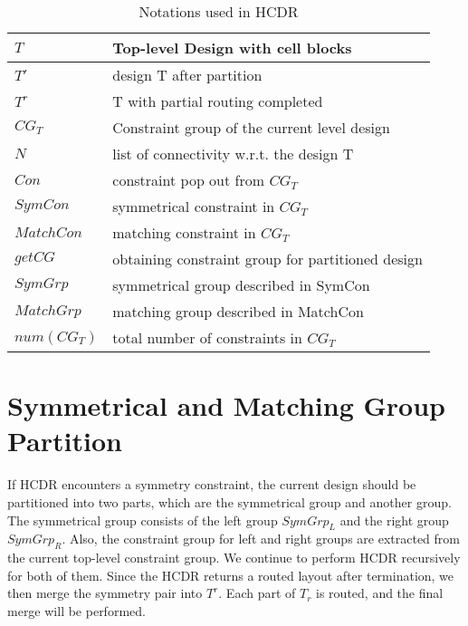     \begin{table}[ht]
      \centering
      \vspace{-1em}
    \caption{Notations used in HCDR}
    \begin{scriptsize}
    \begin{tabular}[t]{|l|l|}
      \hline
      $T$       & Top-level Design with cell blocks \\
      \hline
      $T'$      &   design T after partition      \\
      \hline
      $T^r$       &   T with partial routing completed  \\
      \hline
      $CG_T$      & Constraint group of the current level design  \\
      \hline
      $N$       & list of connectivity w.r.t. the design T  \\
      \hline
      $Con  $   & constraint pop out from $CG_T$    \\
      \hline
      $SymCon$    & symmetrical constraint in $CG_T$  \\
      \hline
      $MatchCon$    & matching constraint in $CG_T$   \\
      \hline
      $getCG$     & obtaining constraint group for partitioned design \\
      \hline
      $SymGrp$    & symmetrical group described in SymCon \\
      \hline
      $MatchGrp$    & matching group described in MatchCon  \\
      \hline
      $num(CG_T)$   & total number of constraints in $CG_T$ \\
      \hline
    \end{tabular}
    \end{scriptsize}
    \label{tableNotation}
    \end{table}
    \vspace{-1em}


  \section{Symmetrical and Matching Group Partition}\label{sec:SMGrp}
    
    If HCDR encounters a symmetry constraint, the current design should be partitioned into two parts, which are the symmetrical group and another group. The symmetrical group consists of the left group $SymGrp_L $ and the right group $SymGrp_R$. Also, the constraint group for left and right groups are extracted from the current top-level constraint group. We continue to perform HCDR recursively for both of them. Since the HCDR returns a routed layout after termination, we then merge the symmetry pair into $T^r$. Each part of $T_r$ is routed, and the final merge will be performed. 

